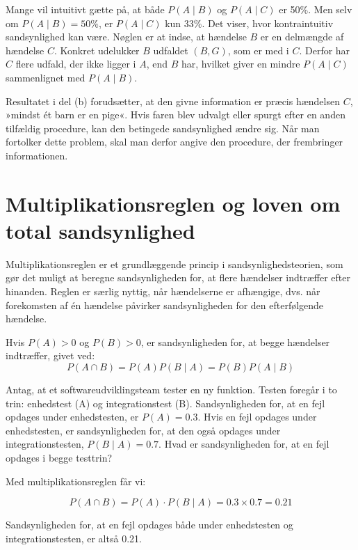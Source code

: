 \begin{remark}
    Mange vil intuitivt gætte på, at både \( P(A \mid B) \) og \( P(A \mid C) \) er 50\%. Men selv om \( P(A \mid B) = 50\%\), er \( P(A \mid C) \) kun 33\%. Det viser, hvor kontraintuitiv sandsynlighed kan være. Nøglen er at indse, at hændelse \( B \) er en delmængde af hændelse \( C \). Konkret udelukker \( B \) udfaldet \( (B, G) \), som er med i \( C \). Derfor har \( C \) flere udfald, der ikke ligger i \( A \), end \( B \) har, hvilket giver en mindre \( P(A \mid C) \) sammenlignet med \( P(A \mid B) \).

    Resultatet i del (b) forudsætter, at den givne information er præcis hændelsen \(C\), »mindst ét barn er en pige«. Hvis faren blev udvalgt eller spurgt efter en anden tilfældig procedure, kan den betingede sandsynlighed ændre sig. Når man fortolker dette problem, skal man derfor angive den procedure, der frembringer informationen.
\end{remark}

\section{Multiplikationsreglen og loven om total sandsynlighed}
Multiplikationsreglen er et grundlæggende princip i sandsynlighedsteorien, som gør det muligt at beregne sandsynligheden for, at flere hændelser indtræffer efter hinanden. Reglen er særlig nyttig, når hændelserne er afhængige, dvs. når forekomsten af én hændelse påvirker sandsynligheden for den efterfølgende hændelse.

\begin{theorem}[Multiplikationsreglen]
    Hvis \(P(A)>0\) og \(P(B)>0\), er sandsynligheden for, at begge hændelser indtræffer, givet ved:
    \[
    P(A \cap B) = P(A) P(B \mid A) = P(B) P(A \mid B)
    \]
\end{theorem}

\begin{example}
    Antag, at et softwareudviklingsteam tester en ny funktion. Testen foregår i to trin: enhedstest (A) og integrationstest (B). Sandsynligheden for, at en fejl opdages under enhedstesten, er $P(A)=0.3$. Hvis en fejl opdages under enhedstesten, er sandsynligheden for, at den også opdages under integrationstesten, $P(B \mid A) = 0.7$. Hvad er sandsynligheden for, at en fejl opdages i begge testtrin?
\end{example}

\begin{solution}
    Med multiplikationsreglen får vi:

\[
P(A \cap B)=P(A) \cdot P(B \mid A)=0.3 \times 0.7=0.21
\]


Sandsynligheden for, at en fejl opdages både under enhedstesten og integrationstesten, er altså 0.21.
\end{solution}

